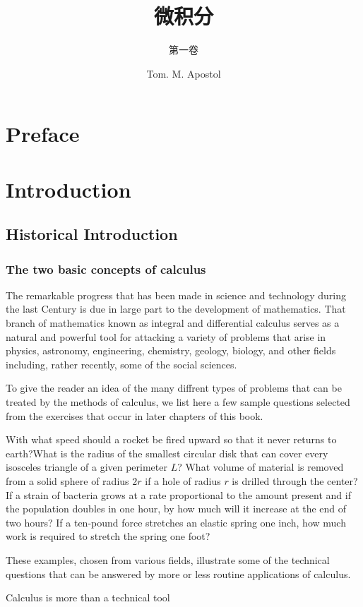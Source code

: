 \documentclass[cn,11pt,chinese]{elegantbook}
\title{微积分}
\subtitle{第一卷}
\author{Tom. M. Apostol}
\numberwithin{equation}{section}
\begin{document}
\maketitle

\chapter*{Preface}


\tableofcontents
\mainmatter
\hypersetup{pageanchor=true}


\chapter{Introduction}
\section{Historical Introduction}

\subsection{The two basic concepts of calculus}
The remarkable progress that has been made in science and technology during the last Century is due in large part to the development of mathematics. That branch of mathematics known as integral and differential calculus serves as a natural and powerful tool for attacking a variety of problems that arise in physics, astronomy, engineering, chemistry, geology, biology, and other fields including, rather recently, some of the social sciences.

To give the reader an idea of the many diffrent types of problems that can be treated by the methods of calculus, we list here a few sample questions selected from the exercises that occur in later chapters of this book.

With what speed should a rocket be fired upward so that it never returns to earth?What is the radius of the smallest circular disk that can cover every isosceles triangle of a given perimeter $L$? What volume of material is removed from a solid sphere of radius $2r$ if a hole of radius $r$ is drilled through the center? If a strain of bacteria grows at a rate proportional to the amount present and if the population doubles in one hour, by how much will it increase at the end of two hours? If a ten-pound force stretches an elastic spring one inch, how much work is required to stretch the spring one foot? 

These examples, chosen from various fields, illustrate some of the technical questions that can be answered by more or less routine applications of calculus.

Calculus is more than a technical tool



% 

\appendix
\end{document}
